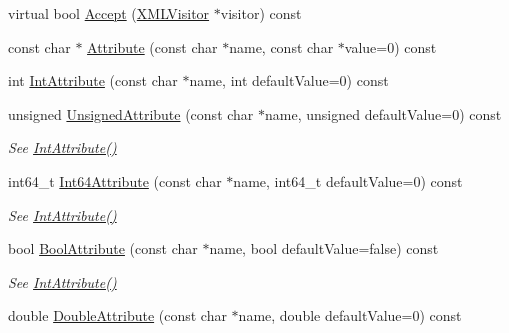 \begin{DoxyCompactItemize}
\item 
virtual bool \hyperlink{classtinyxml2_1_1XMLElement_a36d65438991a1e85096caf39ad13a099}{Accept} (\hyperlink{classtinyxml2_1_1XMLVisitor}{X\+M\+L\+Visitor} $\ast$visitor) const 
\item 
const char $\ast$ \hyperlink{classtinyxml2_1_1XMLElement_a7bdebdf1888074087237f3dd03912740}{Attribute} (const char $\ast$name, const char $\ast$value=0) const 
\item 
int \hyperlink{classtinyxml2_1_1XMLElement_a1e0b2ebd4ae63ae207f84531c20cfa87}{Int\+Attribute} (const char $\ast$name, int default\+Value=0) const 
\item 
unsigned \hyperlink{classtinyxml2_1_1XMLElement_ac57db6a692cdd0ecdfa1568a2024a34b}{Unsigned\+Attribute} (const char $\ast$name, unsigned default\+Value=0) const \hypertarget{classtinyxml2_1_1XMLElement_ac57db6a692cdd0ecdfa1568a2024a34b}{}\label{classtinyxml2_1_1XMLElement_ac57db6a692cdd0ecdfa1568a2024a34b}

\begin{DoxyCompactList}\small\item\em See \hyperlink{classtinyxml2_1_1XMLElement_a1e0b2ebd4ae63ae207f84531c20cfa87}{Int\+Attribute()} \end{DoxyCompactList}\item 
int64\+\_\+t \hyperlink{classtinyxml2_1_1XMLElement_ad57dd4387b9a8106641c0bf678bb1492}{Int64\+Attribute} (const char $\ast$name, int64\+\_\+t default\+Value=0) const \hypertarget{classtinyxml2_1_1XMLElement_ad57dd4387b9a8106641c0bf678bb1492}{}\label{classtinyxml2_1_1XMLElement_ad57dd4387b9a8106641c0bf678bb1492}

\begin{DoxyCompactList}\small\item\em See \hyperlink{classtinyxml2_1_1XMLElement_a1e0b2ebd4ae63ae207f84531c20cfa87}{Int\+Attribute()} \end{DoxyCompactList}\item 
bool \hyperlink{classtinyxml2_1_1XMLElement_a1fda1104d4d1fbdbcc896b0efd9b9496}{Bool\+Attribute} (const char $\ast$name, bool default\+Value=false) const \hypertarget{classtinyxml2_1_1XMLElement_a1fda1104d4d1fbdbcc896b0efd9b9496}{}\label{classtinyxml2_1_1XMLElement_a1fda1104d4d1fbdbcc896b0efd9b9496}

\begin{DoxyCompactList}\small\item\em See \hyperlink{classtinyxml2_1_1XMLElement_a1e0b2ebd4ae63ae207f84531c20cfa87}{Int\+Attribute()} \end{DoxyCompactList}\item 
double \hyperlink{classtinyxml2_1_1XMLElement_a1dad6fa6cd1779a36db348674839e9dc}{Double\+Attribute} (const char $\ast$name, double default\+Value=0) const \hypertarget{classtinyxml2_1_1XMLElement_a1dad6fa6cd1779a36db348674839e9dc}{}\label{classtinyxml2_1_1XMLElement_a1dad6fa6cd1779a36db348674839e9dc}


\end{DoxyCompactItemize}
